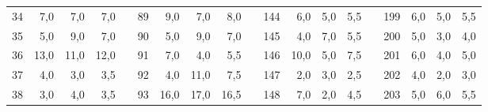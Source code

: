 \begin{table}[H]
{\begin{tabular}{|c|r|r|r|l|c|r|r|r|l|c|r|r|r|lcrrr}
34                                                    & 7,0                                                                       & 7,0                                                                       & 7,0                                                                       &  & 89  & 9,0  & 7,0  & 8,0  &  & 144 & 6,0  & 5,0  & 5,5  & \multicolumn{1}{l|}{} & \multicolumn{1}{c|}{199} & \multicolumn{1}{r|}{6,0}  & \multicolumn{1}{r|}{5,0}  & \multicolumn{1}{r|}{5,5}  \\ \cline{1-4} \cline{6-9} \cline{11-14} \cline{16-19} 
35                                                    & 5,0                                                                       & 9,0                                                                       & 7,0                                                                       &  & 90  & 5,0  & 9,0  & 7,0  &  & 145 & 4,0  & 7,0  & 5,5  & \multicolumn{1}{l|}{} & \multicolumn{1}{c|}{200} & \multicolumn{1}{r|}{5,0}  & \multicolumn{1}{r|}{3,0}  & \multicolumn{1}{r|}{4,0}  \\ \cline{1-4} \cline{6-9} \cline{11-14} \cline{16-19} 
36                                                    & 13,0                                                                      & 11,0                                                                      & 12,0                                                                      &  & 91  & 7,0  & 4,0  & 5,5  &  & 146 & 10,0 & 5,0  & 7,5  & \multicolumn{1}{l|}{} & \multicolumn{1}{c|}{201} & \multicolumn{1}{r|}{6,0}  & \multicolumn{1}{r|}{4,0}  & \multicolumn{1}{r|}{5,0}  \\ \cline{1-4} \cline{6-9} \cline{11-14} \cline{16-19} 
37                                                    & 4,0                                                                       & 3,0                                                                       & 3,5                                                                       &  & 92  & 4,0  & 11,0 & 7,5  &  & 147 & 2,0  & 3,0  & 2,5  & \multicolumn{1}{l|}{} & \multicolumn{1}{c|}{202} & \multicolumn{1}{r|}{4,0}  & \multicolumn{1}{r|}{2,0}  & \multicolumn{1}{r|}{3,0}  \\ \cline{1-4} \cline{6-9} \cline{11-14} \cline{16-19} 
38                                                    & 3,0                                                                       & 4,0                                                                       & 3,5                                                                       &  & 93  & 16,0 & 17,0 & 16,5 &  & 148 & 7,0  & 2,0  & 4,5  & \multicolumn{1}{l|}{} & \multicolumn{1}{c|}{203} & \multicolumn{1}{r|}{5,0}  & \multicolumn{1}{r|}{6,0}  & \multicolumn{1}{r|}{5,5}  \\ \cline{1-4} \cline{6-9} \cline{11-14} \cline{16-19} 

\end{tabular}}
\end{table}
